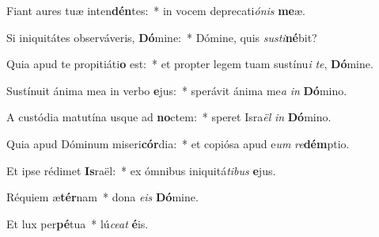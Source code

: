 ﻿\item Fiant aures tuæ inten\textbf{dén}tes:~* in vocem deprecati\textit{ó}\textit{nis} \textbf{me}æ.
\item Si iniquitátes observáveris, \textbf{Dó}mine:~* Dómine, quis \textit{su}\textit{sti}\textbf{né}bit?
\item Quia apud te propitiáti\textbf{o} est:~* et propter legem tuam sustínu\textit{i} \textit{te}, \textbf{Dó}mine.
\item Sustínuit ánima mea in verbo \textbf{e}jus:~* sperávit ánima me\textit{a} \textit{in} \textbf{Dó}mino.
\item A custódia matutína usque ad \textbf{no}ctem:~* speret Isra\textit{ël} \textit{in} \textbf{Dó}mino.
\item Quia apud Dóminum miseri\textbf{cór}dia:~* et copiósa apud e\textit{um} \textit{re}\textbf{dém}ptio.
\item Et ipse rédimet \textbf{Is}raël:~* ex ómnibus iniquitá\textit{ti}\textit{bus} \textbf{e}jus.
\item Réquiem æ\textbf{tér}nam~* dona \textit{e}\textit{is} \textbf{Dó}mine.
\item Et lux per\textbf{pé}tua~* lú\textit{ce}\textit{at} \textbf{é}is.